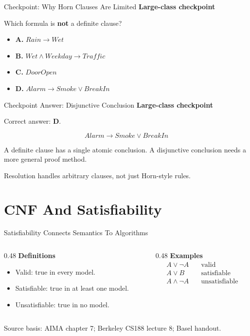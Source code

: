 \documentclass[aspectratio=169,11pt]{beamer}
\newcommand{\minihead}[1]{\textbf{\color{unswblue}#1}}
\newcommand{\activity}{\textbf{\color{unsworange}Large-class checkpoint}}
\newcommand{\choice}[2]{\textbf{#1.} #2}
\newcommand{\source}[1]{\vfill{\scriptsize\color{darkgrey}Source basis: #1}}
\begin{document}
\begin{frame}{Checkpoint: Why Horn Clauses Are Limited}
  \activity

  \vspace{0.4em}
  Which formula is \textbf{not} a definite clause?

  \begin{itemize}
    \item \choice{A}{$Rain \rightarrow Wet$}
    \item \choice{B}{$Wet \land Weekday \rightarrow Traffic$}
    \item \choice{C}{$DoorOpen$}
    \item \choice{D}{$Alarm \rightarrow Smoke \lor BreakIn$}
  \end{itemize}
\end{frame}

\begin{frame}{Checkpoint Answer: Disjunctive Conclusion}
  \activity

  Correct answer: \textbf{D}.

  \[
    Alarm \rightarrow Smoke \lor BreakIn
  \]

  A definite clause has a single atomic conclusion. A disjunctive conclusion needs a more general proof method.

  \vspace{0.8em}
  Resolution handles arbitrary clauses, not just Horn-style rules.
\end{frame}

\section{CNF And Satisfiability}

\begin{frame}{Satisfiability Connects Semantics To Algorithms}
  \begin{columns}[T,onlytextwidth]
    \begin{column}{0.48\textwidth}
      \minihead{Definitions}
      \begin{itemize}
        \item Valid: true in every model.
        \item Satisfiable: true in at least one model.
        \item Unsatisfiable: true in no model.
      \end{itemize}
    \end{column}
    \begin{column}{0.48\textwidth}
      \minihead{Examples}
      \[
      \begin{aligned}
        A \lor \neg A &\quad \text{valid}\\
        A \lor B &\quad \text{satisfiable}\\
        A \land \neg A &\quad \text{unsatisfiable}
      \end{aligned}
      \]
    \end{column}
  \end{columns}

  \source{AIMA chapter 7; Berkeley CS188 lecture 8; Basel handout.}
\end{frame}
\end{document}
